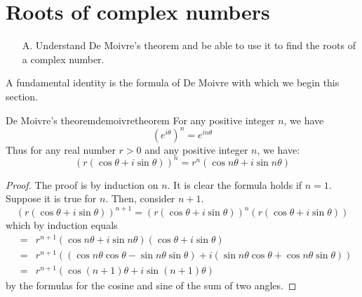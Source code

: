 \section{Roots of complex numbers}

\begin{outcome}
\begin{enumerate}
\item[A.] Understand De Moivre's theorem and be able to use it to find the
roots of a complex number.
\end{enumerate}
\end{outcome}

A fundamental identity is the
 formula of De Moivre with which we begin this section.

\begin{theorem}{De Moivre's theorem}{demoivretheorem}
For any positive integer $n$, we have
\begin{equation*}
\left( e^{i \theta} \right)^n = e^{i n \theta}
\end{equation*}
Thus for any real number $r>0$ and any positive integer $n$, we have:
\begin{equation*}
\left( r\left( \cos \theta+i\sin \theta\right) \right) ^{n}=r^{n}\left( \cos n \theta +i\sin
n\theta\right) 
\end{equation*}
\end{theorem}

\begin{proof}
 The proof is by induction on $n$. It is clear the formula holds if $n=1.$ Suppose it is true
for $n.$ Then, consider $n+1$.
\begin{equation*}
\left( r\left( \cos \theta+i\sin \theta\right) \right) ^{n+1}=\left( r\left( \cos
\theta+i\sin \theta\right) \right) ^{n}\left( r\left( \cos \theta+i\sin \theta\right) \right)
\end{equation*}
which by induction equals
\begin{eqnarray*}
&=&r^{n+1}\left( \cos n\theta+i\sin n\theta\right) \left( \cos \theta+i\sin \theta\right) \\
&=& r^{n+1}\left( \left( \cos n\theta\cos \theta-\sin n\theta\sin \theta\right) +i\left( \sin
n\theta\cos \theta+\cos n\theta\sin \theta\right) \right)\\
&=&r^{n+1}\left( \cos \left( n+1\right) \theta+i\sin \left( n+1\right) \theta\right)
\end{eqnarray*}
by the formulas for the cosine and sine of the sum of two angles. 
\end{proof}

